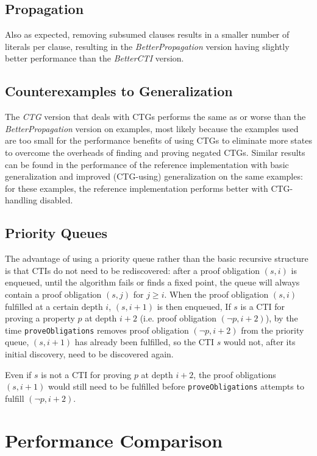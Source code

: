 \documentclass[12pt,a4paper,twoside,openright]{report}
\begin{document}
\subsection{Propagation}

Also as expected, removing subsumed clauses results in a smaller number of literals per clause, resulting in
the \emph{BetterPropagation} version having slightly better performance than the \emph{BetterCTI} version.

\subsection{Counterexamples to Generalization}

The \emph{CTG} version that deals with CTGs performs the same as or worse than the \emph{BetterPropagation} version
on examples, most likely because the examples used are too small for the performance benefits of using CTGs to
eliminate more states to overcome the overheads of finding and proving negated CTGs. Similar results can be found
in the performance of the reference implementation with basic generalization and improved (CTG-using) generalization
on the same examples: for these examples, the reference implementation performs better with CTG-handling disabled.

\subsection{Priority Queues}

The advantage of using a priority queue rather than the basic recursive structure is that CTIs do not need
to be rediscovered: after a proof obligation $(s,i)$ is enqueued, until the algorithm fails or finds a fixed point,
the queue will always contain a proof obligation $(s,j)$ for $j \geq i$. When the proof obligation $(s,i)$
fulfilled at a certain depth $i$, $(s,i + 1)$ is then enqueued, If $s$ is a CTI for proving a property
$p$ at depth $i + 2$ (i.e. proof obligation $(\neg p, i + 2)$), by the time \verb,proveObligations, removes
proof obligation $(\neg p, i + 2)$ from the priority queue, $(s, i+1)$ has already been fulfilled, so the
CTI $s$ would not, after its initial discovery, need to be discovered again.

Even if $s$ is not a CTI for proving $p$ at depth $i + 2$, the proof obligations $(s, i+1)$ would still need to
be fulfilled before \verb,proveObligations, attempts to fulfill $(\neg p, i + 2)$.
\section{Performance Comparison}
\end{document}
